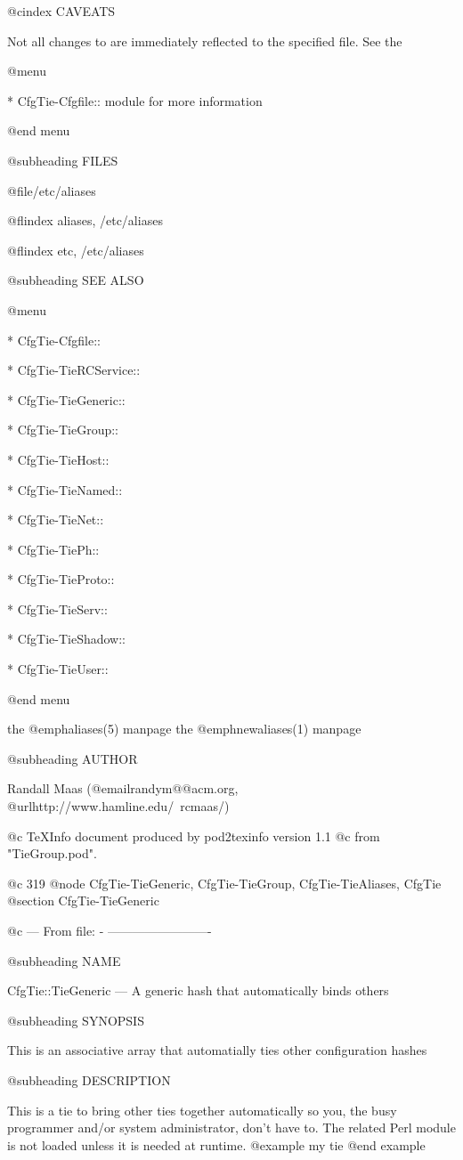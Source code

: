 @cindex CAVEATS

Not all changes to are immediately reflected to the specified file.  See the

@menu

* CfgTie-Cfgfile::	
 module for more information

@end menu

@subheading FILES

@file{/etc/aliases}

@flindex aliases, /etc/aliases

@flindex etc, /etc/aliases

@subheading SEE ALSO


@menu

* CfgTie-Cfgfile::	
    
* CfgTie-TieRCService::	


* CfgTie-TieGeneric::	
 
* CfgTie-TieGroup::	
 
* CfgTie-TieHost::	


* CfgTie-TieNamed::	
   
* CfgTie-TieNet::	
 
* CfgTie-TiePh::	


* CfgTie-TieProto::	
   
* CfgTie-TieServ::	
  
* CfgTie-TieShadow::	


* CfgTie-TieUser::	


@end menu

the @emph{aliases}(5) manpage
the @emph{newaliases}(1) manpage

@subheading AUTHOR

Randall Maas (@email{randym@@acm.org}, @url{http://www.hamline.edu/~rcmaas/})

@c TeXInfo document produced by pod2texinfo version 1.1
@c from "TieGroup.pod".


@c 319
@node CfgTie-TieGeneric, CfgTie-TieGroup, CfgTie-TieAliases, CfgTie
@section CfgTie-TieGeneric


@c --- From file: - -------------------------

@subheading NAME


CfgTie::TieGeneric --- A generic hash that automatically binds others

@subheading SYNOPSIS

This is an associative array that automatially ties other configuration hashes

@subheading DESCRIPTION

This is a tie to bring other ties together automatically so you, the busy
programmer and/or system administrator, don't have to.  The related Perl
module is not loaded unless it is needed at runtime.
@example
        my %
        tie %
@end example

